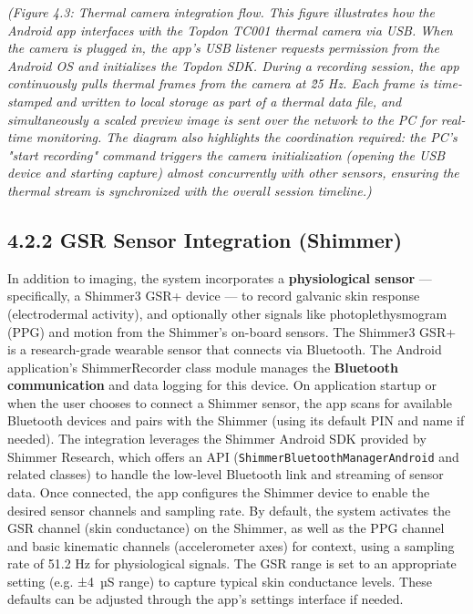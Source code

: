 \documentclass[11pt,a4paper]{report}
\begin{document}
\textit{(Figure 4.3: Thermal camera integration flow. This figure illustrates
how the Android app interfaces with the Topdon TC001 thermal camera via
USB. When the camera is plugged in, the app's USB listener requests
permission from the Android OS and initializes the Topdon SDK. During a
recording session, the app continuously pulls thermal frames from the
camera at \~25 Hz. Each frame is time-stamped and written to local
storage as part of a thermal data file, and simultaneously a scaled
preview image is sent over the network to the PC for real-time
monitoring. The diagram also highlights the coordination required: the
PC's "start recording" command triggers the camera initialization
(opening the USB device and starting capture) almost concurrently with
other sensors, ensuring the thermal stream is synchronized with the
overall session timeline.)}

\subsection{4.2.2 GSR Sensor Integration (Shimmer)}

In addition to imaging, the system incorporates a \textbf{physiological
sensor} --- specifically, a Shimmer3 GSR+ device --- to record galvanic
skin response (electrodermal activity), and optionally other signals
like photoplethysmogram (PPG) and motion from the Shimmer's on-board
sensors. The Shimmer3 GSR+ is a research-grade wearable sensor that
connects via Bluetooth. The Android application's ShimmerRecorder class
module manages the \textbf{Bluetooth communication} and data logging for this
device. On application startup or when the user chooses to connect a
Shimmer sensor, the app scans for available Bluetooth devices and pairs
with the Shimmer (using its default PIN and name if needed). The
integration leverages the Shimmer Android SDK provided by Shimmer
Research, which offers an API (\texttt{ShimmerBluetoothManagerAndroid} and
related classes) to handle the low-level Bluetooth link and streaming of
sensor
data\cite{GSRPPGMachineLearning2024}\cite{SimulatorValidityPhysiological2025}.
Once connected, the app configures the Shimmer device to enable the
desired sensor channels and sampling rate. By default, the system
activates the GSR channel (skin conductance) on the Shimmer, as well as
the PPG channel and basic kinematic channels (accelerometer axes) for
context, using a sampling rate of 51.2 Hz for physiological
signals\cite{GSRGuideIMotions}.
The GSR range is set to an appropriate setting (e.g. ±4 µS range) to
capture typical skin conductance
levels\cite{ElectrodermalActivityWiki}.
These defaults can be adjusted through the app's settings interface if
needed.
\end{document}
